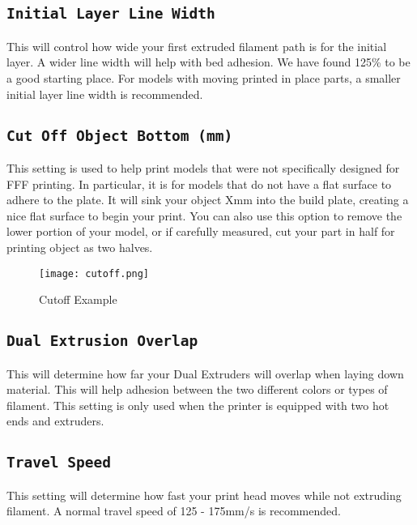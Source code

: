 \subsection{\texttt{Initial Layer Line Width}}
This will control how wide your first extruded filament path is for the initial layer. A wider line width will help with bed adhesion. We have found 125\% to be a good starting place. For models with moving printed in place parts, a smaller initial layer line width is recommended. %

\subsection{\texttt{Cut Off Object Bottom (mm)}}
This setting is used to help print models that were not specifically designed for FFF printing. In particular, it is for models that do not have a flat surface to adhere to the plate. It will sink your object Xmm into the build plate, creating a nice flat surface to begin your print. You can also use this option to remove the lower portion of your model, or if carefully measured, cut your part in half for printing object as two halves.
\begin{figure}[H]
\centering
\texttt{[image: cutoff.png]}
\caption{Cutoff Example}
\label{fig:Cutoff Example}
\end{figure}

\subsection{\texttt{Dual Extrusion Overlap}}
This will determine how far your Dual Extruders will overlap when laying down material. This will help adhesion between the two different colors or types of filament. This setting is only used when the printer is equipped with two hot ends and extruders.

\subsection{\texttt{Travel Speed}}
This setting will determine how fast your print head moves while not extruding filament. A normal travel speed of 125 - 175mm/s is recommended.

